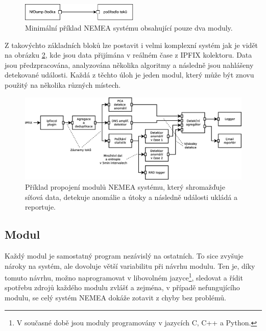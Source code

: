 \begin{figure}[h]
    \centering
    \includegraphics[width=0.5\textwidth]{fig/nemea-basic.pdf}
    \caption{Minimální příklad NEMEA systému obsahující pouze dva moduly.} \label{fig:nemea-schema}
  
\end{figure}

Z takovýchto základních bloků lze postavit i velmi komplexní systém jak je vidět na obrázku \ref{fig:nemea-example-2}, kde jsou data přijímána v reálném čase z IPFIX\cite{ipfix} kolektoru. Data jsou předzpracována, analyzována několika algoritmy a následně jsou nahlášeny detekované události. Každá z těchto úloh je jeden modul, který může být znovu použitý na několika různých místech.

\begin{figure}[h]
    \centering
    \includegraphics[width=1\textwidth]{fig/nemea-example-2-cz.eps}
    \caption{Příklad propojení modulů NEMEA systému, který shromažďuje síťová data, detekuje anomálie a útoky a následně události ukládá a reportuje.} \label{fig:nemea-example-2}
  
\end{figure}



\subsection{Modul}

Každý modul je samostatný program nezávislý na ostatních. To sice zvyšuje nároky na systém, ale dovoluje větší variabilitu při návrhu modulu. Ten je, díky tomuto návrhu, možno naprogramovat v libovolném jazyce\footnote{V současné době jsou moduly programovány v jazycích C, C++ a Python.}, sledovat a řídit spotřebu zdrojů každého modulu zvlášť a zejména, v případě nefungujícího modulu, se celý systém NEMEA dokáže zotavit z chyby bez problémů. 

